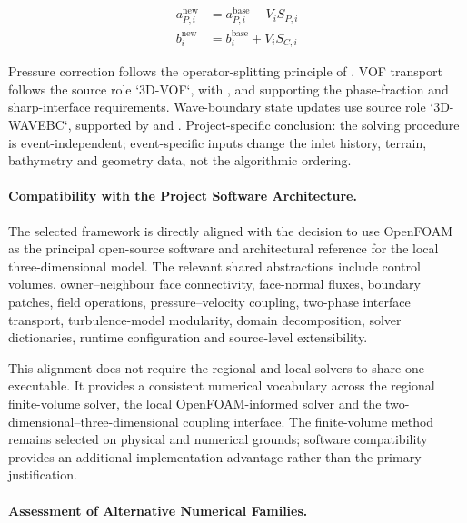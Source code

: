 \begin{align}
  a_{P,i}^{\mathrm{new}}
  &=
  a_{P,i}^{\mathrm{base}}
  -
  V_i S_{P,i}
  \label{eq:res-num-spec-local-source-ap-update}
  \\
  b_i^{\mathrm{new}}
  &=
  b_i^{\mathrm{base}}
  +
  V_i S_{C,i}
  \label{eq:res-num-spec-local-source-b-update}
\end{align}

Pressure correction follows the operator-splitting principle of
\textcite{issa1986operator}. VOF transport follows the source role
`3D-VOF`, with \textcite{hirt1981vof},
\textcite{roenby2016computational} and \textcite{vukcevic2018sharp}
supporting the phase-fraction and sharp-interface requirements.
Wave-boundary state updates use source role `3D-WAVEBC`, supported by
\textcite{higuera2013realistic} and
\textcite{jacobsen2012waves2foam}. Project-specific conclusion: the
solving procedure is event-independent; event-specific inputs change
the inlet history, terrain, bathymetry and geometry data, not the
algorithmic ordering.

\paragraph{Compatibility with the Project Software Architecture.}
\label{sec:num-local-three-dimensional-software-compatibility}

The selected framework is directly aligned with the decision to use
OpenFOAM as the principal open-source software and architectural
reference for the local three-dimensional model. The relevant shared
abstractions include control volumes, owner--neighbour face
connectivity, face-normal fluxes, boundary patches, field operations,
pressure--velocity coupling, two-phase interface transport,
turbulence-model modularity, domain decomposition, solver dictionaries,
runtime configuration and source-level extensibility.

This alignment does not require the regional and local solvers to share
one executable. It provides a consistent numerical vocabulary across the
regional finite-volume solver, the local OpenFOAM-informed solver and
the two-dimensional--three-dimensional coupling interface. The
finite-volume method remains selected on physical and numerical grounds;
software compatibility provides an additional implementation advantage
rather than the primary justification.

\paragraph{Assessment of Alternative Numerical Families.}
\label{sec:num-local-three-dimensional-alternative-assessment}

